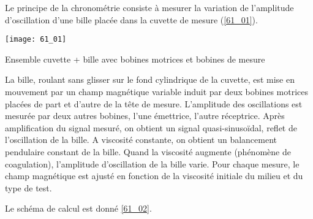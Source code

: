 \normaltrue
\correctionfalse


\setcounter{question}{0}%
\ifcorrection
\else
{}
\fi


\ifprof
\else
Le principe de la chronométrie consiste à mesurer la variation de l’amplitude d’oscillation d’une
bille placée dans la cuvette de mesure (\autoref{61_01}).%

\begin{marginfigure}\centering
\texttt{[image: 61\_01]}
\caption{\label{61_01} Ensemble cuvette + bille avec bobines motrices et bobines de mesure}
\end{marginfigure}

La bille, roulant sans glisser sur le fond cylindrique de la cuvette, est mise en mouvement par un
champ magnétique variable induit par deux bobines motrices placées de part et d’autre de la tête de
mesure.
L’amplitude des oscillations est mesurée par deux autres bobines, l’une émettrice, l’autre réceptrice.
Après amplification du signal mesuré, on obtient un signal quasi-sinusoïdal, reflet de l’oscillation
de la bille. A viscosité constante, on obtient un balancement pendulaire constant de la bille. Quand
la viscosité augmente (phénomène de coagulation), l’amplitude d’oscillation de la bille varie.
Pour chaque mesure, le champ magnétique est ajusté en fonction de la viscosité initiale du milieu et
du type de test.



Le schéma de calcul est donné \autoref{61_02}.


